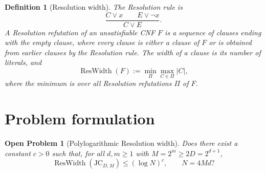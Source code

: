 \documentclass[10pt]{article}
\newtheorem{definition}{Definition}
\newtheorem{problem}{Open Problem}
\begin{document}
\begin{definition}[Resolution width]
The Resolution rule is
\[
\frac{C\vee x \qquad E\vee\neg x}{C\vee E}.
\]
A Resolution refutation of an unsatisfiable CNF $F$ is a sequence of
clauses ending with the empty clause, where every clause is either a clause
of $F$ or is obtained from earlier clauses by the Resolution rule.
The width of a clause is its number of literals, and
\[
\operatorname{ResWidth}(F)
:=
\min_{\Pi}
\max_{C\in\Pi}|C|,
\]
where the minimum is over all Resolution refutations $\Pi$ of $F$.
\end{definition}

\section{Problem formulation}

\begin{problem}[Polylogarithmic Resolution width]
Does there exist a constant $c>0$ such that, for all $d,m\ge 1$ with
$M=2^m\ge 2D=2^{d+1}$,
\[
\operatorname{ResWidth}(\mathrm{JC}_{D,M})
\le
(\log N)^c,
\qquad
N=4Md?
\]
\end{problem}
\end{document}
